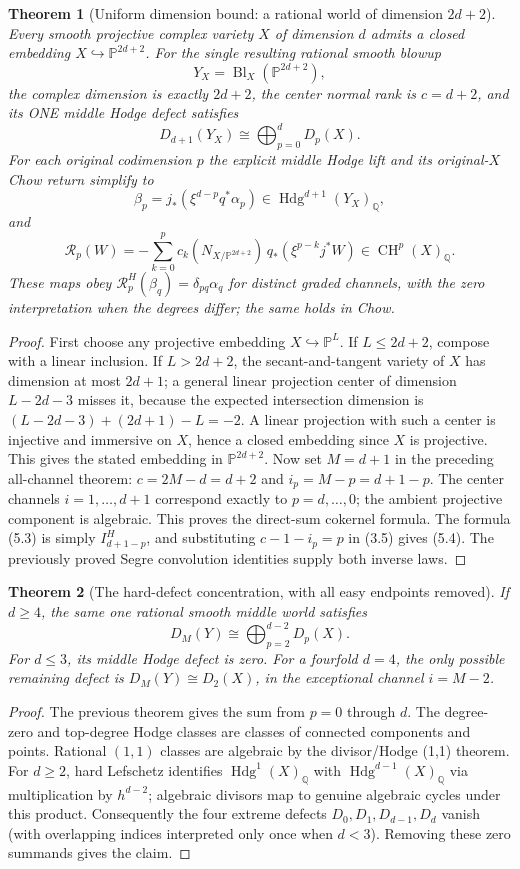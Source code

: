 \documentclass[11pt]{article}
\newcommand{\Q}{\mathbb Q}
\newcommand{\CH}{\operatorname{CH}}
\newcommand{\Hdg}{\operatorname{Hdg}}
\newtheorem{theorem}{Theorem}
\begin{document}
\begin{theorem}[Uniform dimension bound: a rational world of dimension $2d+2$]
Every smooth projective complex variety $X$ of dimension $d$
admits a closed embedding $X\hookrightarrow\mathbb P^{2d+2}$.
For the single resulting rational smooth blowup
\[
 \boxed{Y_X=\operatorname{Bl}_X(\mathbb P^{2d+2}),}
\]
the complex dimension is exactly $2d+2$, the center normal
rank is $c=d+2$, and its ONE middle Hodge defect satisfies
\[
 \boxed{
 D_{d+1}(Y_X)\cong\bigoplus_{p=0}^d D_p(X).}
 \tag{5.2}
\]
For each original codimension $p$ the explicit middle
Hodge lift and its original-$X$ Chow return simplify to
\[
 \boxed{\beta_p=j_*(\xi^{d-p}q^*\alpha_p)
       \in\Hdg^{d+1}(Y_X)_{\Q},}
 \tag{5.3}
\]
and
\[
 \boxed{\mathcal R_p(W)=
  -\sum_{k=0}^{p}c_k(N_{X/\mathbb P^{2d+2}})
        \,q_*(\xi^{p-k}j^*W)
       \in\CH^p(X)_{\Q}.}
 \tag{5.4}
\]
These maps obey
$\mathcal R_p^H(\beta_q)=\delta_{pq}\alpha_q$
for distinct graded channels, with the zero interpretation
when the degrees differ; the same holds in Chow.
\end{theorem}
\begin{proof}
First choose any projective embedding $X\hookrightarrow\mathbb P^L$.
If $L\le2d+2$, compose with a linear inclusion.
If $L>2d+2$, the secant-and-tangent variety of $X$ has
dimension at most $2d+1$; a general linear projection
center of dimension $L-2d-3$ misses it, because the
expected intersection dimension is
$(L-2d-3)+(2d+1)-L=-2$.
A linear projection with such a center is injective and
immersive on $X$, hence a closed embedding since $X$
is projective. This gives the stated embedding in
$\mathbb P^{2d+2}$.
Now set $M=d+1$ in the preceding all-channel theorem:
$c=2M-d=d+2$ and $i_p=M-p=d+1-p$.
The center channels $i=1,\ldots,d+1$ correspond
exactly to $p=d,\ldots,0$; the ambient projective
component is algebraic. This proves the direct-sum
cokernel formula. The formula (5.3) is simply
$I_{d+1-p}^H$, and substituting $c-1-i_p=p$
in (3.5) gives (5.4). The previously proved
Segre convolution identities supply both inverse laws.
\end{proof}

\begin{theorem}[The hard-defect concentration, with all easy endpoints removed]
If $d\ge4$, the same one rational smooth middle world satisfies
\[
 \boxed{
 D_M(Y)\cong\bigoplus_{p=2}^{d-2}D_p(X).}
\]
For $d\le3$, its middle Hodge defect is zero.
For a fourfold $d=4$, the only possible remaining defect is
$D_M(Y)\cong D_2(X)$, in the exceptional channel $i=M-2$.
\end{theorem}
\begin{proof}
The previous theorem gives the sum from $p=0$ through $d$.
The degree-zero and top-degree Hodge classes are classes
of connected components and points. Rational $(1,1)$ classes
are algebraic by the divisor/Hodge (1,1) theorem.
For $d\ge2$, hard Lefschetz identifies
$\Hdg^1(X)_{\Q}$ with $\Hdg^{d-1}(X)_{\Q}$
via multiplication by $h^{d-2}$; algebraic
divisors map to genuine algebraic cycles under this
product. Consequently the four extreme defects
$D_0,D_1,D_{d-1},D_d$ vanish (with overlapping
indices interpreted only once when $d<3$).
Removing these zero summands gives the claim.
\end{proof}
\end{document}
